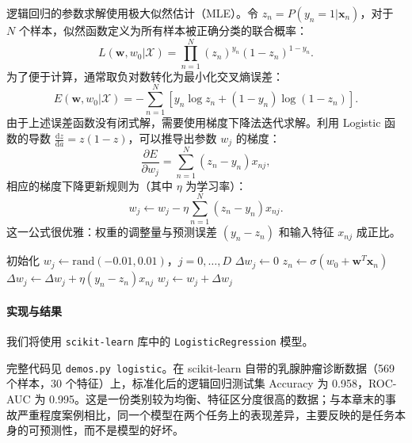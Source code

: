 逻辑回归的参数求解使用极大似然估计（MLE）。令 $z_n = P(y_n=1|\mathbf{x}_n)$，对于 $N$ 个样本，似然函数定义为所有样本被正确分类的联合概率：
\begin{equation}
    L(\mathbf{w}, w_0|\mathcal{X}) = \prod_{n=1}^{N} (z_n)^{y_n} (1 - z_n)^{1 - y_n}.
\end{equation}
为了便于计算，通常取负对数转化为最小化交叉熵误差：
\begin{equation}
    E(\mathbf{w}, w_0|\mathcal{X}) = - \sum_{n=1}^{N} \left[ y_n \log z_n + (1 - y_n) \log (1 - z_n) \right].
\end{equation}
由于上述误差函数没有闭式解，需要使用梯度下降法迭代求解。利用 Logistic 函数的导数 $\frac{\mathrm{d} z}{\mathrm{d} a} = z(1-z)$，可以推导出参数 $w_j$ 的梯度：
\begin{equation}
    \frac{\partial E}{\partial w_j} = \sum_{n=1}^N (z_n - y_n) x_{nj},
\end{equation}
相应的梯度下降更新规则为（其中 $\eta$ 为学习率）：
\begin{equation}
    w_j \leftarrow w_j - \eta \sum_{n=1}^N (z_n - y_n) x_{nj}.
\end{equation}
这一公式很优雅：权重的调整量与预测误差 $(y_n - z_n)$ 和输入特征 $x_{nj}$ 成正比。

\begin{algorithm}[H]
    \caption{逻辑回归梯度下降算法}
    \begin{algorithmic}[1]
        \State 初始化 $w_j \leftarrow \mathrm{rand}(-0.01,0.01)$，$j=0,\ldots,D$
                \State $\Delta w_j \leftarrow 0$
            \EndFor
                \State $z_n \leftarrow \sigma(w_0+\mathbf{w}^{T}\mathbf{x}_n)$
                    \State $\Delta w_j \leftarrow \Delta w_j+\eta (y_n-z_n)x_{nj}$
                \EndFor
            \EndFor
                \State $w_j \leftarrow w_j+\Delta w_j$
            \EndFor
        \EndWhile
    \end{algorithmic}
\end{algorithm}

\paragraph{实现与结果}
我们将使用 \texttt{scikit-learn} 库中的 \texttt{LogisticRegression} 模型。

完整代码见 \texttt{demos.py logistic}。在 scikit-learn 自带的乳腺肿瘤诊断数据（569 个样本，30 个特征）上，标准化后的逻辑回归测试集 Accuracy 为 0.958，ROC-AUC 为 0.995。这是一份类别较为均衡、特征区分度很高的数据；与本章末的事故严重程度案例相比，同一个模型在两个任务上的表现差异，主要反映的是任务本身的可预测性，而不是模型的好坏。

